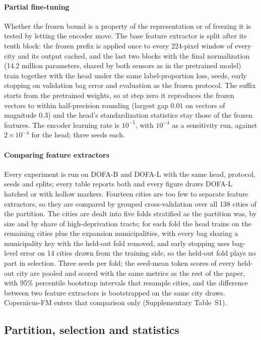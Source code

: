 \documentclass[11pt]{article}
\begin{document}
\paragraph{Partial fine-tuning} Whether the frozen bound is a property of the
representation or of freezing it is tested by letting the encoder move. The base
feature extractor is split after its tenth block: the frozen prefix is applied once to every
224-pixel window of every city and its output cached, and the last two blocks with the
final normalization (14.2 million parameters, shared by both sensors as in the
pretrained model) train together with the head under the same label-proportion loss,
seeds, early stopping on validation bag error and evaluation as the frozen protocol. The
suffix starts from the pretrained weights, so at step zero it reproduces the frozen
vectors to within half-precision rounding (largest gap $0.01$ on vectors of magnitude
$0.3$) and the head's standardization statistics stay those of the frozen features. The
encoder learning rate is $10^{-5}$, with $10^{-4}$ as a sensitivity run, against
$2 \times 10^{-4}$ for the head; three seeds each.

\paragraph{Comparing feature extractors} Every experiment is run on DOFA-B and DOFA-L
with the same head, protocol, seeds and splits; every table reports both and
every figure draws DOFA-L hatched or with hollow markers. Fourteen cities
are too few to separate feature extractors, so they are compared by grouped cross-validation
over all 138 cities of the partition. The cities are dealt into five folds stratified as
the partition was, by size and by share of high-deprivation tracts; for each fold the
head trains on the remaining cities plus the expansion municipalities, with every bag
sharing a municipality key with the held-out fold removed, and early stopping uses
bag-level error on 14 cities drawn from the training side, so the held-out fold plays no
part in selection. Three seeds per fold; the seed-mean token scores of every held-out
city are pooled and scored with the same metrics as the rest of the paper, with 95\%
percentile bootstrap intervals that resample cities, and the difference between two
feature extractors is bootstrapped on the same city draws. Copernicus-FM enters that
comparison only (Supplementary Table~S1).

\subsection{Partition, selection and statistics}
\end{document}
